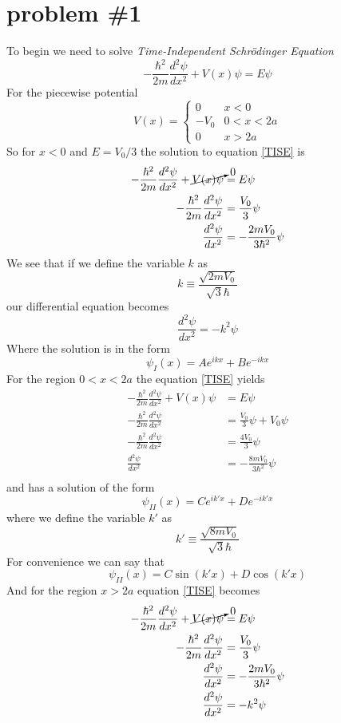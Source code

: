 \documentclass[11pt]{article}
\numberwithin{equation}{section}
\begin{document}


\section{problem \#1}
To begin we need to solve \emph{Time-Independent Schr\"{o}dinger Equation}
\begin{equation}
-\frac{\hbar^2}{2m}\frac{d^2\psi}{dx^2}+V(x)\psi = E\psi
\label{TISE}
\end{equation}
For the piecewise potential 
$$V(x) = \left\{\begin{array}{ll}
	0	&x<0\\
	-V_0	&0<x<2a\\
	0	&x>2a
	\end{array}\right.$$
So for $x<0$ and $E = V_0/3$ the solution to equation \ref{TISE} is
\begin{align*}
-\frac{\hbar^2}{2m}\frac{d^2\psi}{dx^2}+\cancelto{0}{V(x)\psi} &= E\psi\\
-\frac{\hbar^2}{2m}\frac{d^2\psi}{dx^2} &= \frac{V_0}{3}\psi\\
\frac{d^2\psi}{dx^2} &= -\frac{2mV_0}{3\hbar^2}\psi
\end{align*}
We see that if we define the variable $k$ as
$$k\equiv\frac{\sqrt{2mV_0}}{\sqrt{3}\hbar}$$
our differential equation becomes
$$\frac{d^2\psi}{dx^2} = -k^2\psi$$
Where the solution is in the form
$$\psi_I(x) = Ae^{ikx}+Be^{-ikx}$$
For the region $0<x<2a$ the equation \ref{TISE} yields
\begin{align*}
-\frac{\hbar^2}{2m}\frac{d^2\psi}{dx^2}+V(x)\psi &= E\psi\\
-\frac{\hbar^2}{2m}\frac{d^2\psi}{dx^2}&=  \frac{V_0}{3}\psi + V_0\psi\\
-\frac{\hbar^2}{2m}\frac{d^2\psi}{dx^2}&=  \frac{4V_0}{3}\psi\\
\frac{d^2\psi}{dx^2} &= -\frac{8mV_0}{3\hbar^2}\psi\\
\end{align*}
and has a solution of the form
$$\psi_{II}(x) = Ce^{ik'x} + De^{-ik'x}$$
where we define the variable $k'$ as
$$k'\equiv\frac{\sqrt{8mV_0}}{\sqrt{3}\hbar}$$
For convenience we can say that
$$\psi_{II}(x) = C\sin(k'x) + D\cos(k'x)$$
And for the region $x>2a$ equation \ref{TISE} becomes
\begin{align*}
-\frac{\hbar^2}{2m}\frac{d^2\psi}{dx^2}+\cancelto{0}{V(x)\psi} &= E\psi\\
-\frac{\hbar^2}{2m}\frac{d^2\psi}{dx^2} &= \frac{V_0}{3}\psi\\
\frac{d^2\psi}{dx^2} &= -\frac{2mV_0}{3\hbar^2}\psi\\
\frac{d^2\psi}{dx^2} &= -k^2\psi
\end{align*}
\end{document}
